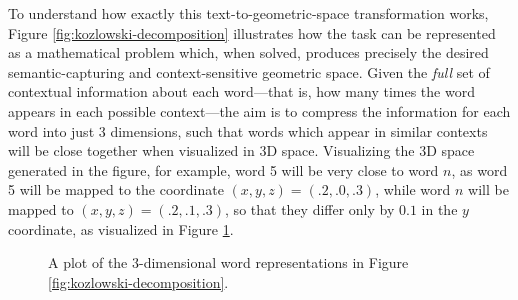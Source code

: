 \documentclass[11pt]{article}
\begin{document}
To understand how exactly this text-to-geometric-space transformation works, Figure \ref{fig:kozlowski-decomposition} illustrates how the task can be represented as a mathematical problem which, when solved, produces precisely the desired semantic-capturing and context-sensitive geometric space. Given the \textit{full} set of contextual information about each word---that is, how many times the word appears in each possible context---the aim is to compress the information for each word into just 3 dimensions, such that words which appear in similar contexts will be close together when visualized in 3D space. Visualizing the 3D space generated in the figure, for example, word 5 will be very close to word $n$, as word 5 will be mapped to the coordinate $(x,y,z) = (.2,.0,.3)$, while word $n$ will be mapped to $(x,y,z) = (.2,.1,.3)$, so that they differ only by $0.1$ in the $y$ coordinate, as visualized in Figure \ref{fig:geometry-td}.

\begin{figure}[ht!]
	\centering
	\caption{A plot of the 3-dimensional word representations in Figure \ref{fig:kozlowski-decomposition}.}
	\label{fig:geometry-td}
\end{figure}
\end{document}
